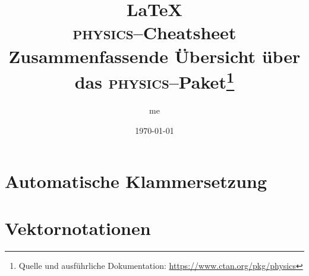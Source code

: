 
\author{me}
\title{
	\LaTeX\\
	\textsc{physics}--Cheatsheet\\
	\small{
		Zusammenfassende Übersicht über das \textsc{physics}--Paket\footnote{Quelle und ausführliche Dokumentation:
			\url{https://www.ctan.org/pkg/physics}
		}
	}
}
\date{\today}


\maketitle
\tableofcontents

\clearpage
\section{Automatische Klammersetzung}

\section{Vektornotationen}


